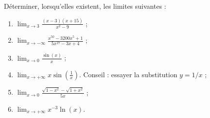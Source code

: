 
\begin{exercice}\label{exoDS2010bis-0003}

Déterminer, lorsqu'elles existent, les limites suivantes :
\begin{enumerate}
\item 
  $\displaystyle \lim_{x\to 3} \frac{(x-3)(x+15)}{x^2-9}$ ;
  \item
    $\displaystyle \lim_{x\to -\infty}\frac{x^{50}-3200x^{5}+1}{5x^{17}-3x+4}$ ;
    \item
      $\displaystyle \lim_{x\to 0}\frac{\sin (x)}{x}$ ;
      \item
        $\displaystyle \lim_{x\to +\infty} x \sin (\frac{1}{x})$. Conseil : essayer la substitution $y=1/x$ ;
        \item
          $\displaystyle \lim_{x\to 0}\frac{\sqrt{1-x^2}-\sqrt{1+x^2}}{5x}$ ;
          \item
          $\displaystyle \lim_{x\to +\infty} x^{-3}\ln(x)$.
          
\end{enumerate}


\end{exercice}
